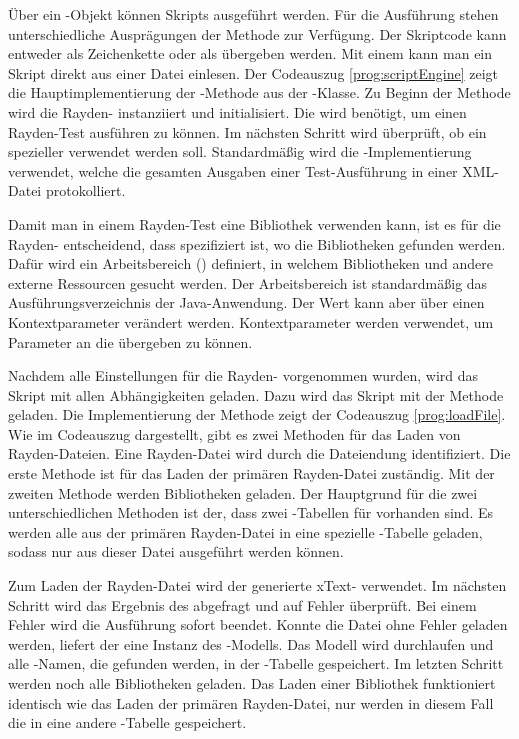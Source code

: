 \SuperPar
Über ein -Objekt können Skripts ausgeführt werden. Für die Ausführung stehen unterschiedliche Ausprägungen der Methode  zur Verfügung. Der Skriptcode kann entweder als Zeichenkette oder als  übergeben werden. Mit einem  kann man ein Skript direkt aus einer Datei einlesen. Der Codeauszug \ref{prog:scriptEngine} zeigt die Hauptimplementierung der -Methode aus der -Klasse. Zu Beginn der Methode wird die Rayden- instanziiert und initialisiert. Die  wird benötigt, um einen Rayden-Test ausführen zu können. Im nächsten Schritt wird überprüft, ob ein spezieller  verwendet werden soll. Standardmäßig wird die -Implementierung verwendet, welche die gesamten Ausgaben einer Test-Ausführung in einer XML-Datei protokolliert. 

\SuperPar
Damit man in einem Rayden-Test eine Bibliothek verwenden kann, ist es für die Rayden- entscheidend, dass spezifiziert ist, wo die Bibliotheken gefunden werden. Dafür wird ein Arbeitsbereich () definiert, in welchem Bibliotheken und andere externe Ressourcen gesucht werden. Der Arbeitsbereich ist standardmäßig das Ausführungsverzeichnis der Java-Anwendung. Der Wert kann aber über einen Kontextparameter verändert werden. Kontextparameter werden verwendet, um Parameter an die  übergeben zu können. 

\SuperPar
Nachdem alle Einstellungen für die Rayden- vorgenommen wurden, wird das Skript mit allen Abhängigkeiten geladen. Dazu wird das Skript mit der Methode  geladen. Die Implementierung der Methode zeigt der Codeauszug \ref{prog:loadFile}. Wie im Codeauszug dargestellt, gibt es zwei Methoden für das Laden von Rayden-Dateien. Eine Rayden-Datei wird durch die Dateiendung  identifiziert. Die erste Methode  ist für das Laden der primären Rayden-Datei zuständig. Mit der zweiten Methode  werden Bibliotheken geladen. Der Hauptgrund für die zwei unterschiedlichen Methoden ist der, dass zwei -Tabellen für  vorhanden sind. Es werden alle  aus der primären Rayden-Datei in eine spezielle -Tabelle geladen, sodass nur  aus dieser Datei ausgeführt werden können.

\SuperPar
Zum Laden der Rayden-Datei wird der generierte xText- verwendet. Im nächsten Schritt wird das Ergebnis des  abgefragt und auf Fehler überprüft. Bei einem Fehler wird die Ausführung sofort beendet. Konnte die Datei ohne Fehler geladen werden, liefert der  eine Instanz des -Modells. Das Modell wird durchlaufen und alle -Namen, die gefunden werden, in der -Tabelle gespeichert. Im letzten Schritt werden noch alle Bibliotheken geladen. Das Laden einer Bibliothek funktioniert identisch wie das Laden der primären Rayden-Datei, nur werden in diesem Fall die  in eine andere -Tabelle gespeichert. 

